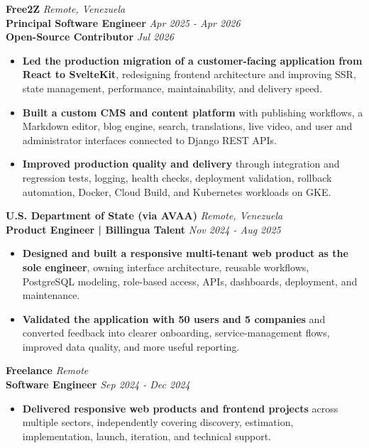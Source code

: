 \documentclass[10pt]{article}
\begin{document}
\vspace{2pt}
\textbf{Free2Z} \hfill \textit{Remote, Venezuela} \\
\textbf{Principal Software Engineer} \hfill \textit{Apr 2025 - Apr 2026} \\
\textbf{Open-Source Contributor} \hfill \textit{Jul 2026}
\begin{itemize}
    \item \textbf{Led the production migration of a customer-facing application from React to SvelteKit}, redesigning frontend architecture and improving SSR, state management, performance, maintainability, and delivery speed.
    \item \textbf{Built a custom CMS and content platform} with publishing workflows, a Markdown editor, blog engine, search, translations, live video, and user and administrator interfaces connected to Django REST APIs.
    \item \textbf{Improved production quality and delivery} through integration and regression tests, logging, health checks, deployment validation, rollback automation, Docker, Cloud Build, and Kubernetes workloads on GKE.
\end{itemize}

\vspace{2pt}
\textbf{U.S. Department of State (via AVAA)} \hfill \textit{Remote, Venezuela} \\
\textbf{Product Engineer | Billingua Talent} \hfill \textit{Nov 2024 - Aug 2025}
\begin{itemize}
    \item \textbf{Designed and built a responsive multi-tenant web product as the sole engineer}, owning interface architecture, reusable workflows, PostgreSQL modeling, role-based access, APIs, dashboards, deployment, and maintenance.
    \item \textbf{Validated the application with 50 users and 5 companies} and converted feedback into clearer onboarding, service-management flows, improved data quality, and more useful reporting.
\end{itemize}

\vspace{2pt}
\textbf{Freelance} \hfill \textit{Remote} \\
\textbf{Software Engineer} \hfill \textit{Sep 2024 - Dec 2024}
\begin{itemize}
    \item \textbf{Delivered responsive web products and frontend projects} across multiple sectors, independently covering discovery, estimation, implementation, launch, iteration, and technical support.
\end{itemize}
\end{document}
